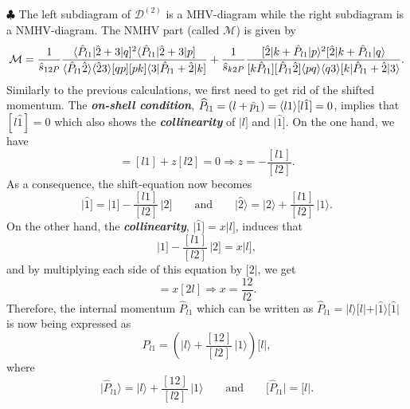 $\clubsuit$ The left subdiagram of $\mathcal{D}^{(2)}$ is a MHV-diagram while the right subdiagram is a NMHV-diagram. The NMHV part (called $\mathcal{M}$) is given by
\begin{equation}
\mathcal{M}=\frac{1}{\hat{s}_{12P}} \frac{\langle \hat{P}_{l1}\vert \hat{2}+3\vert q]^2\langle \hat{P}_{l1}\vert \hat{2}+3\vert p]}{\langle\hat{P}_{l1} \hat{2}\rangle \langle\hat{2} 3\rangle [qp][pk] \langle 3\vert \hat{P}_{l1}+\hat{2}\vert k]}+\frac{1}{\hat{s}_{k2P}} \frac{[\hat{2}\vert k+\hat{P}_{l1}\vert p\rangle^2 [\hat{2}\vert k+\hat{P}_{l1}\vert q\rangle}{[k\hat{P}_{l1}] [\hat{P}_{l1} \hat{2}] \langle pq\rangle \langle q3\rangle [k\vert \hat{P}_{l1}+\hat{2}\vert 3\rangle}.
\end{equation}
Similarly to the previous calculations, we first need to get rid of the shifted momentum. The \textbf{\emph{on-shell condition}}, $\widehat{P}_{l1}=(l+\hat{p}_1)=\langle l1\rangle[l\hat{1}]=0$, implies that $[l\hat{1}]=0$ which also shows the \textbf{\emph{collinearity}} of $\vert l]$ and $\vert \hat{1}]$. On the one hand, we have
\begin{equation}
[l\hat{1}]=[l1]+z[l2]=0 \Longrightarrow z=-\frac{[l1]}{[l2]} .
\end{equation}
As a consequence, the shift-equation now becomes
\begin{equation}
\vert \hat{1}] =\vert 1]-\frac{[l1]}{[l2]} \, \vert 2] \qquad \text{and} \qquad \vert \hat{2} \rangle = \vert 2 \rangle +\frac{[l1]}{[l2]} \, \vert 1\rangle .
\end{equation}
On the other hand, the \textbf{\emph{collinearity}}, $\vert \hat{1}]=x \vert l]$, induces that
\begin{equation}
\vert 1]-\frac{[l1]}{[l2]} \, \vert 2]=x\vert l],
\end{equation} 
and by multiplying each side of this equation by $[2\vert$, we get
\begin{equation}
[21]=x[2l] \Longrightarrow x=\frac{12}{l2}.
\end{equation}
Therefore, the internal momentum $\widehat{P}_{l1}$ which can be written as $\widehat{P}_{l1}=\vert l \rangle [l\vert +\vert \hat{1}\rangle [\hat{1} \vert$ is now being expressed as 
\begin{equation}
\widehat{P}_{l1}=\left(\vert l\rangle +\frac{[12]}{[l2]} \, \vert 1\rangle \right) [l\vert ,
\end{equation}
where
\begin{equation}
\vert \widehat{P}_{l1} \rangle =\vert l\rangle +\frac{[12]}{[l2]} \, \vert 1\rangle \qquad \text{and} \qquad [\widehat{P}_{l1} \vert =[l\vert .
\end{equation}
